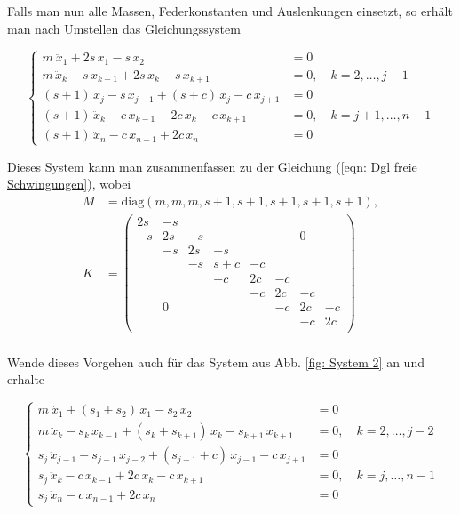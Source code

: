 \documentclass[a4paper,12pt]{report}
\newcommand{\diag}{\text{diag}}
\newcommand{\1}{\mathds{1}}
\theoremstyle{plain} %
\theoremstyle{definition} %
\theoremstyle{remark}
\begin{document}
            Falls man nun alle Massen, Federkonstanten und Auslenkungen einsetzt, so erhält man nach Umstellen das Gleichungssystem

            $$\begin{cases}
                  m\ \ddot x_1 + 2s\,x_1 - s\,x_2 & = 0   \\
                  m\,\ddot x_k -s\,x_{k-1} + 2s\,x_k -s\,x_{k+1} & = 0,\quad k=2,\dots,j-1\\
                  (s+1)\,\ddot x_j -s\,x_{j-1} + (s+c)\,x_j -c\,x_{j+1} & = 0\\
                  (s+1)\,\ddot x_k -c\,x_{k-1} + 2c\,x_k -c\,x_{k+1} & = 0,\quad k=j+1,\dots,n-1\\
                  (s+1)\,\ddot x_n -c\,x_{n-1}+ 2c\,x_n & = 0
            \end{cases}$$

            Dieses System kann man zusammenfassen zu der Gleichung (\ref{eqn: Dgl freie Schwingungen}),
            wobei
            \begin{align}
                  M &= \diag(m, m, m, s+1, s+1,s+1, s+1,  s+1),\label{def: M1}\\
                  K &= \begin{pmatrix}
                        2s & -s &  &  &  &  &  &  \\
                        -s &  2s& -s &  &  &  &0  &  \\
                         & -s & 2s & -s &  &  &  &  \\
                         &  & -s & s+c & -c &  &  &  \\
                         &  &  & -c & 2c & -c &  &  \\
                         &  &  &  & -c & 2c & -c &  \\
                         & 0 &  &  &  & -c & 2c &  -c\\
                         &  &  &  &  &  & -c & 2c \\
                        \end{pmatrix}\label{def: K1}
            \end{align}\\

            Wende dieses Vorgehen auch für das System aus Abb. \ref{fig: System 2} an und erhalte
            
            $$\begin{cases}
                  m\ \ddot x_1 + (s_1+s_2)\,x_1 - s_2\,x_2 & = 0   \\
                  m\,\ddot x_k -s_k\,x_{k-1} + (s_k+s_{k+1})\,x_k -s_{k+1}\,x_{k+1} & = 0,\quad k=2,\dots,j-2\\
                  s_j\,\ddot x_{j-1} -s_{j-1}\,x_{j-2} + (s_{j-1}+c)\,x_{j-1} -c\,x_{j+1} & = 0\\
                  s_j\,\ddot x_k -c\,x_{k-1} + 2c\,x_k -c\,x_{k+1} & = 0,\quad k=j,\dots,n-1\\
                  s_j\,\ddot x_n -c\,x_{n-1}+ 2c\,x_n & = 0
            \end{cases}$$
            
\end{document}
